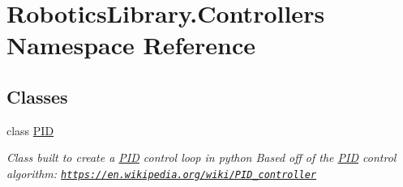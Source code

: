 \hypertarget{namespace_robotics_library_1_1_controllers}{}\section{Robotics\+Library.\+Controllers Namespace Reference}
\label{namespace_robotics_library_1_1_controllers}
\subsection*{Classes}
\begin{DoxyCompactItemize}
\item 
class \hyperlink{class_robotics_library_1_1_controllers_1_1_p_i_d}{P\+ID}
\begin{DoxyCompactList}\small\item\em Class built to create a \hyperlink{class_robotics_library_1_1_controllers_1_1_p_i_d}{P\+ID} control loop in python Based off of the \hyperlink{class_robotics_library_1_1_controllers_1_1_p_i_d}{P\+ID} control algorithm\+: \href{https://en.wikipedia.org/wiki/PID_controller}{\tt https\+://en.\+wikipedia.\+org/wiki/\+P\+I\+D\+\_\+controller} \end{DoxyCompactList}\end{DoxyCompactItemize}

